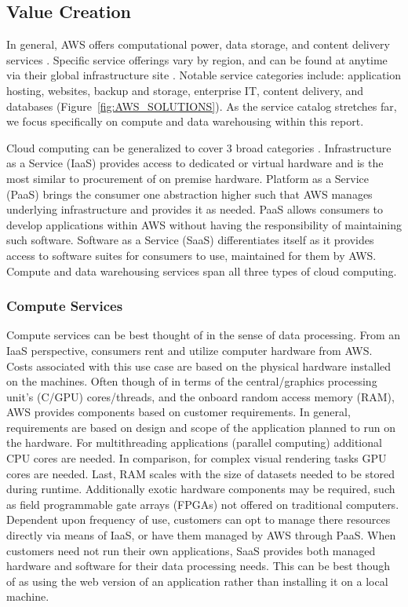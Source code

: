 \documentclass[a4paper, 12pt]{article}
\begin{document}
\subsection{Value Creation}
In general, AWS offers computational power, data storage, and content delivery services \cite[p.~10]{AMZN_AWS_WHITEPAPER}.
Specific service offerings vary by region, and can be found at anytime via their global infrastructure site \cite{AMZN_AWS_REGIONAL_SERVICES}.
Notable service categories include: application hosting, websites, backup and storage, enterprise IT, content delivery, and databases (Figure~\ref{fig:AWS_SOLUTIONS}).
As the service catalog stretches far, we focus specifically on compute and data warehousing within this report.

Cloud computing can be generalized to cover 3 broad categories \cite{AMZN_AWS_CLOUD_COMPUTE}.
Infrastructure as a Service (IaaS) provides access to dedicated or virtual hardware and is the most similar to procurement of on premise hardware.
Platform as a Service (PaaS) brings the consumer one abstraction higher such that AWS manages underlying infrastructure and provides it as needed.
PaaS allows consumers to develop applications within AWS without having the responsibility of maintaining such software.
Software as a Service (SaaS) differentiates itself as it provides access to software suites for consumers to use, maintained for them by AWS.
Compute and data warehousing services span all three types of cloud computing.

\subsubsection{Compute Services}
Compute services can be best thought of in the sense of data processing.
From an IaaS perspective, consumers rent and utilize computer hardware from AWS.
Costs associated with this use case are based on the physical hardware installed on the machines.
Often though of in terms of the central/graphics processing unit's (C/GPU) cores/threads, and the onboard random access memory (RAM), AWS provides components based on customer requirements.
In general, requirements are based on design and scope of the application planned to run on the hardware.
For multithreading applications (parallel computing) additional CPU cores are needed.
In comparison, for complex visual rendering tasks GPU cores are needed.
Last, RAM scales with the size of datasets needed to be stored during runtime.
Additionally exotic hardware components may be required, such as field programmable gate arrays (FPGAs) not offered on traditional computers.
Dependent upon frequency of use, customers can opt to manage there resources directly via means of IaaS, or have them managed by AWS through PaaS.
When customers need not run their own applications, SaaS provides both managed hardware and software for their data processing needs.
This can be best though of as using the web version of an application rather than installing it on a local machine.
\end{document}
